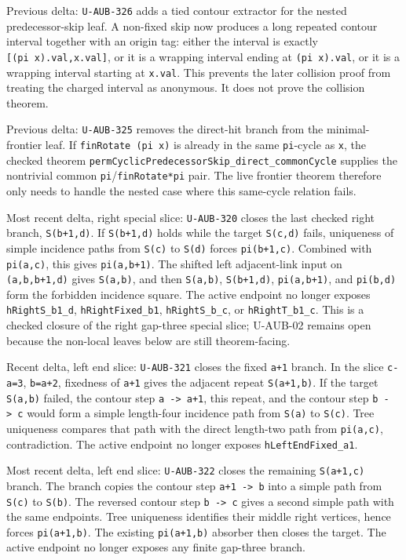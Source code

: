 \documentclass[
]{article}
\begin{document}
Previous delta: \texttt{U-AUB-326} adds a tied contour extractor for the
nested predecessor-skip leaf. A non-fixed skip now produces a long
repeated contour interval together with an origin tag: either the
interval is exactly \texttt{{[}(pi\ x).val,x.val{]}}, or it is a
wrapping interval ending at \texttt{(pi\ x).val}, or it is a wrapping
interval starting at \texttt{x.val}. This prevents the later collision
proof from treating the charged interval as anonymous. It does not prove
the collision theorem.

Previous delta: \texttt{U-AUB-325} removes the direct-hit branch from
the minimal-frontier leaf. If \texttt{finRotate\ (pi\ x)} is already in
the same \texttt{pi}-cycle as \texttt{x}, the checked theorem
\texttt{permCyclicPredecessorSkip\_direct\_commonCycle} supplies the
nontrivial common \texttt{pi}/\texttt{finRotate*pi} pair. The live
frontier theorem therefore only needs to handle the nested case where
this same-cycle relation fails.

Most recent delta, right special slice: \texttt{U-AUB-320} closes the
last checked right branch, \texttt{S(b+1,d)}. If \texttt{S(b+1,d)} holds
while the target \texttt{S(c,d)} fails, uniqueness of simple incidence
paths from \texttt{S(c)} to \texttt{S(d)} forces \texttt{pi(b+1,c)}.
Combined with \texttt{pi(a,c)}, this gives \texttt{pi(a,b+1)}. The
shifted left adjacent-link input on \texttt{(a,b,b+1,d)} gives
\texttt{S(a,b)}, and then \texttt{S(a,b)}, \texttt{S(b+1,d)},
\texttt{pi(a,b+1)}, and \texttt{pi(b,d)} form the forbidden incidence
square. The active endpoint no longer exposes \texttt{hRightS\_b1\_d},
\texttt{hRightFixed\_b1}, \texttt{hRightS\_b\_c}, or
\texttt{hRightT\_b1\_c}. This is a checked closure of the right
gap-three special slice; U-AUB-02 remains open because the non-local
leaves below are still theorem-facing.

Recent delta, left end slice: \texttt{U-AUB-321} closes the fixed
\texttt{a+1} branch. In the slice \texttt{c-a=3}, \texttt{b=a+2},
fixedness of \texttt{a+1} gives the adjacent repeat \texttt{S(a+1,b)}.
If the target \texttt{S(a,b)} failed, the contour step
\texttt{a\ -\textgreater{}\ a+1}, this repeat, and the contour step
\texttt{b\ -\textgreater{}\ c} would form a simple length-four incidence
path from \texttt{S(a)} to \texttt{S(c)}. Tree uniqueness compares that
path with the direct length-two path from \texttt{pi(a,c)},
contradiction. The active endpoint no longer exposes
\texttt{hLeftEndFixed\_a1}.

Most recent delta, left end slice: \texttt{U-AUB-322} closes the
remaining \texttt{S(a+1,c)} branch. The branch copies the contour step
\texttt{a+1\ -\textgreater{}\ b} into a simple path from \texttt{S(c)}
to \texttt{S(b)}. The reversed contour step
\texttt{b\ -\textgreater{}\ c} gives a second simple path with the same
endpoints. Tree uniqueness identifies their middle right vertices, hence
forces \texttt{pi(a+1,b)}. The existing \texttt{pi(a+1,b)} absorber then
closes the target. The active endpoint no longer exposes any finite
gap-three branch.
\end{document}
